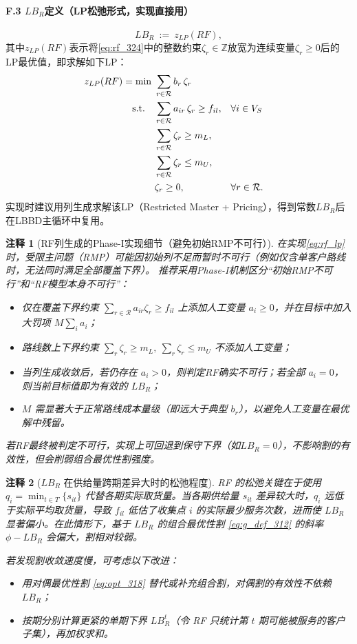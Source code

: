 \documentclass{article}
\newtheorem{remark}{注释}
\begin{document}
\paragraph{F.3 $LB_R$定义（LP松弛形式，实现直接用）}
\begin{equation}
LB_R\ :=\ z_{LP}(RF),
\label{eq:lbr_value}
\end{equation}
其中$z_{LP}(RF)$表示将\eqref{eq:rf_324}中的整数约束$\zeta_r\in\mathbb Z$放宽为连续变量$\zeta_r\ge 0$后的LP最优值，即求解如下LP：
\begin{align}
z_{LP}(RF)=\min\ & \sum_{r\in\mathcal R} b_r\,\zeta_r \notag\\
\text{s.t.}\quad
& \sum_{r\in\mathcal R} a_{ir}\,\zeta_r \ge f_{il}, && \forall i\in V_S \notag\\
& \sum_{r\in\mathcal R} \zeta_r \ge m_L, \notag\\
& \sum_{r\in\mathcal R} \zeta_r \le m_U, \notag\\
& \zeta_r \ge 0, && \forall r\in\mathcal R .
\label{eq:rf_lp}
\end{align}
实现时建议用列生成求解该LP（Restricted Master + Pricing），得到常数$LB_R$后在LBBD主循环中复用。

\begin{remark}[RF列生成的Phase-I实现细节（避免初始RMP不可行）]
在实现\eqref{eq:rf_lp}时，受限主问题（RMP）可能因初始列不足而暂时不可行（例如仅含单客户路线时，无法同时满足全部覆盖下界）。
推荐采用Phase-I机制区分“初始RMP不可行”和“RF模型本身不可行”：
\begin{itemize}
  \item 仅在覆盖下界约束 $\sum_{r\in\mathcal R} a_{ir}\zeta_r \ge f_{il}$ 上添加人工变量 $a_i\ge 0$，并在目标中加入大罚项 $M\sum_i a_i$；
  \item 路线数上下界约束 $\sum_r\zeta_r\ge m_L,\ \sum_r\zeta_r\le m_U$ 不添加人工变量；
  \item 当列生成收敛后，若仍存在 $a_i>0$，则判定RF确实不可行；若全部 $a_i=0$，则当前目标值即为有效的 $LB_R$；
  \item $M$ 需显著大于正常路线成本量级（即远大于典型 $b_r$），以避免人工变量在最优解中残留。
\end{itemize}
若RF最终被判定不可行，实现上可回退到保守下界（如$LB_R=0$），不影响割的有效性，但会削弱组合最优性割强度。
\end{remark}

\begin{remark}[$LB_R$ 在供给量跨期差异大时的松弛程度]
RF 的松弛关键在于使用 $q_i=\min_{t\in T}\{s_{it}\}$ 代替各期实际取货量。当各期供给量 $s_{it}$ 差异较大时，$q_i$ 远低于实际平均取货量，导致 $f_{il}$ 低估了收集点 $i$ 的实际最少服务次数，进而使 $LB_R$ 显著偏小。在此情形下，基于 $LB_R$ 的组合最优性割 \eqref{eq:g_def_312} 的斜率 $\phi-LB_R$ 会偏大，割相对较弱。

若发现割收敛速度慢，可考虑以下改进：
\begin{itemize}
  \item 用对偶最优性割 \eqref{eq:opt_318} 替代或补充组合割，对偶割的有效性不依赖 $LB_R$；
  \item 按期分别计算更紧的单期下界 $LB_R^t$（令 RF 只统计第 $t$ 期可能被服务的客户子集），再加权求和。
\end{itemize}
\end{remark}
\end{document}
